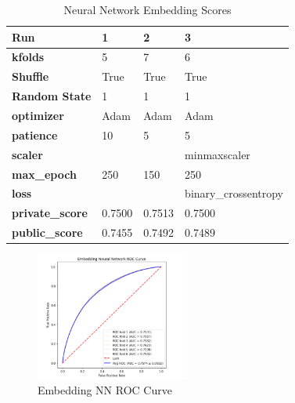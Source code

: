 \documentclass[sigconf, nonacm]{acmart}
\begin{document}
\begin{table}[h]
	\caption{Neural Network Embedding Scores}
	\label{tab:emb}
	\begin{tabular}{@{}|l|l|l|l|@{}}
		\toprule
		\textbf{Run}               & \textbf{1} & \textbf{2} & \textbf{3}           \\ \midrule
		\textbf{kfolds}            & 5          & 7          & 6                    \\ \midrule
		\textbf{Shuffle}           & True       & True       & True                 \\ \midrule
		\textbf{Random State}      & 1          & 1          & 1                    \\ \midrule
		\textbf{optimizer}         & Adam       & Adam       & Adam                 \\ \midrule
		\textbf{patience}          & 10         & 5          & 5                    \\ \midrule
		\textbf{scaler}            &            &            & minmaxscaler         \\ \midrule
		\textbf{max\_epoch}        & 250        & 150        & 250                  \\ \midrule
		\textbf{loss}              &            &            & binary\_crossentropy \\ \midrule
		\textbf{private\_score}    & 0.7500     & 0.7513     & 0.7500               \\ \midrule
		\textbf{public\_score}     & 0.7455     & 0.7492     & 0.7489               \\  \bottomrule
	\end{tabular}
\end{table}

\begin{figure}[h]
	\centering
	\includegraphics[width=0.45\textwidth]{embedding_nn/ROC-AUC.PNG}
	\caption{Embedding NN ROC Curve}
	\label{fig:embedding_nn_roc}
\end{figure}
\end{document}
